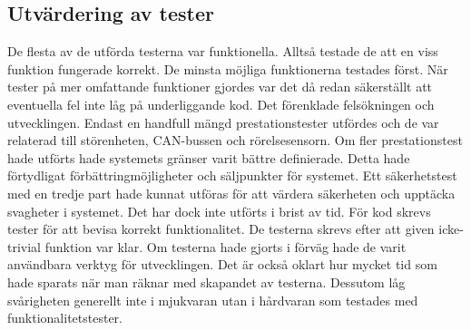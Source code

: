 \subsection{Utvärdering av tester}
De flesta av de utförda testerna var funktionella. Alltså testade de att en viss funktion fungerade korrekt. De minsta möjliga funktionerna testades först. När tester på mer omfattande funktioner gjordes var det då redan säkerställt att eventuella fel inte låg på underliggande kod. Det förenklade felsökningen och utvecklingen. 
\newline\newline
Endast en handfull mängd prestationstester utfördes och de var relaterad till störenheten, CAN-bussen och rörelsesensorn. Om fler prestationstest hade utförts hade systemets gränser varit bättre definierade. Detta hade förtydligat förbättringmöjligheter och säljpunkter för systemet.
Ett säkerhetstest med en tredje part hade kunnat utföras för att värdera säkerheten och upptäcka svagheter i systemet. Det har dock inte utförts i brist av tid.
\newline\newline
För kod skrevs tester för att bevisa korrekt funktionalitet. De testerna skrevs efter att given icke-trivial funktion var klar. Om testerna hade gjorts i förväg hade de varit användbara verktyg för utvecklingen. Det är också oklart hur mycket tid som hade sparats när man räknar med skapandet av testerna. Dessutom låg svårigheten generellt inte i mjukvaran utan i hårdvaran som testades med funktionalitetstester. 
\label{sec:utvärderingtest}

\newpage
